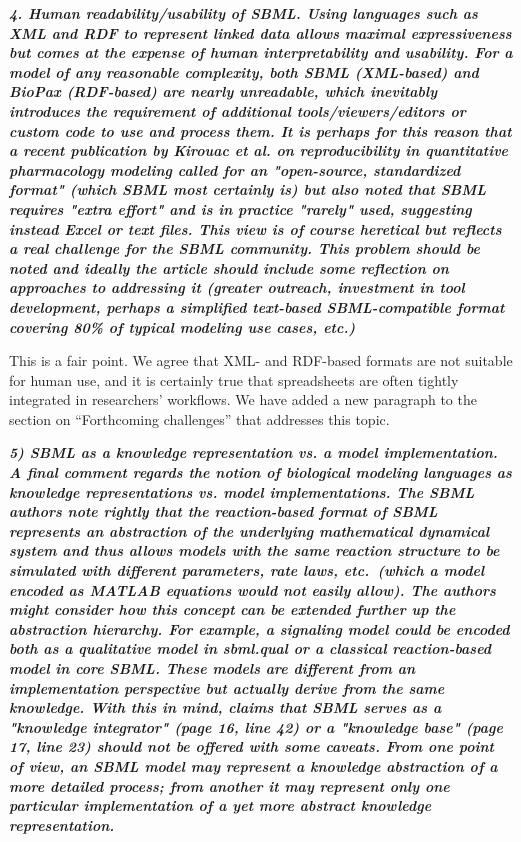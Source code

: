 \documentclass[11pt]{mhletter}
\begin{document}
\textbf{\textit{4. Human readability/usability of SBML. Using languages such as XML and RDF to represent linked data allows maximal expressiveness but comes at the expense of human interpretability and usability. For a model of any reasonable complexity, both SBML (XML-based) and BioPax (RDF-based) are nearly unreadable, which inevitably introduces the requirement of additional tools/viewers/editors or custom code to use and process them. It is perhaps for this reason that a recent publication by Kirouac et al. on reproducibility in quantitative pharmacology modeling  called for an "open-source, standardized format" (which SBML most certainly is) but also noted that SBML requires "extra effort" and is in practice "rarely" used, suggesting instead Excel or text files. This view is of course heretical but reflects a real challenge for the SBML community. This problem should be noted and ideally the article should include some reflection on approaches to addressing it (greater outreach, investment in tool development, perhaps a simplified text-based SBML-compatible format covering 80\% of typical modeling use cases, etc.)}}

This is a fair point.  We agree that XML- and RDF-based formats are not suitable for human use, and it is certainly true that spreadsheets are often tightly integrated in researchers' workflows.  We have added a new paragraph to the section on ``Forthcoming challenges'' that addresses this topic.


\textbf{\textit{5) SBML as a knowledge representation vs. a model implementation.  A final comment regards the notion of biological modeling languages as knowledge representations vs. model implementations. The SBML authors note rightly that the reaction-based format of SBML represents an abstraction of the underlying mathematical dynamical system and thus allows models with the same reaction structure to be simulated with different parameters, rate laws, etc.\ (which a model encoded as MATLAB equations would not easily allow). The authors might consider how this concept can be extended further up the abstraction hierarchy. For example, a signaling model could be encoded both as a qualitative model in sbml.qual or a classical reaction-based model in core SBML. These models are different from an implementation perspective but actually derive from the same knowledge. With this in mind, claims that SBML serves as a "knowledge integrator" (page 16, line 42) or a "knowledge base" (page 17, line 23) should not be offered with some caveats. From one point of view, an SBML model may represent a knowledge abstraction of a more detailed process; from another it may represent only one particular implementation of a yet more abstract knowledge representation.}}
\end{document}
